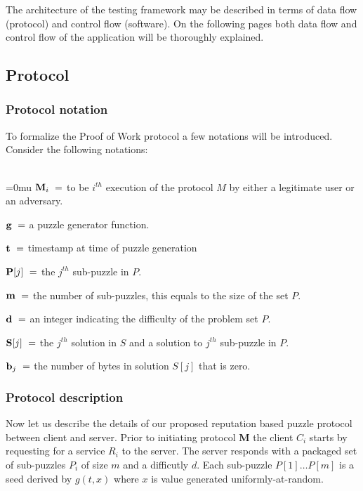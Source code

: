 The architecture of the testing framework may be described in terms of data flow (protocol) and control flow (software). On the following pages both data flow and control flow of the application will be thoroughly explained.

\subsection{Protocol}

\subsubsection{Protocol notation}
To formalize the Proof of Work protocol a few notations will be introduced. Consider the following notations:
\\
\\
\indent \begin{minipage}{0.9\linewidth}
\thickmuskip=0mu
${\textbf M_i} \ = $ to be $i^{th}$ execution of the protocol $M$ by either a legitimate user or an adversary. 

${\textbf g} \ = $ a puzzle generator function.

${\textbf t} \ = $ timestamp at time of puzzle generation

${\textbf P[j]} \ = $ the $j^{th}$ sub-puzzle in $P$.

${\textbf m} \ = $ the number of sub-puzzles, this equals to the size of the set $P$. 

${\textbf d} \ = $ an integer indicating the difficulty of the problem set $P$. 

${\textbf S[j]} \ = $ the $j^{th}$ solution in $S$ and a solution to $j^{th}$ sub-puzzle in $P$. 

${\textbf b_j} \ = $ the number of bytes in solution $S[j]$ that is zero. 
\vspace*{-10pt}
\end{minipage}

\subsubsection{Protocol description}
 Now let us describe the details of our proposed reputation based puzzle protocol between client and server. Prior to initiating protocol \textbf{M} the client $C_i$ starts by requesting for a service $R_i$ to the server. The server responds with a packaged set of sub-puzzles $P_i$ of size $m$ and a difficutly $d$. Each sub-puzzle $P[1] \dots P[m]$ is a seed derived by $g(t,x)$ where $x$ is value generated uniformly-at-random.

